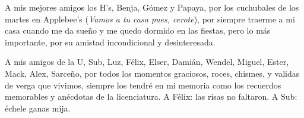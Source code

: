 A mis mejores amigos los H's, Benja, Gómez y Papaya, por los cuchubales de
los martes en Applebee's (\textit{Vamos a tu casa pues, cerote}), por siempre 
traerme a mi casa cuando me da sueño y me quedo dormido en las fiestas, pero
lo más importante, por su amistad incondicional y desinteresada.

A mis amigos de la U, Sub, Luz, Félix, Elser, Damián, Wendel, Miguel, Ester, Mack, Alex, 
Sarceño, por todos los momentos graciosos, roces, chismes, y validas de verga que vivimos,
siempre los tendré en mi memoria como los recuerdos memorables y 
anécdotas de la licenciatura. A Félix: las risas no faltaron. A Sub: échele ganas mija.
% 
